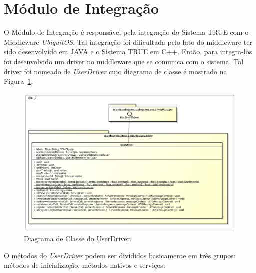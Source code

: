\section{Módulo de Integração}

O Módulo de Integração é responsável pela integração do Sistema TRUE  com o Middleware \textit{UbiquitOS}. Tal integração foi dificultada pelo fato do middleware ter sido desenvolvido em JAVA e o Sistema TRUE em C++. Então, para integra-los foi desenvolvido um driver no middleware que se comunica com o sistema. Tal driver foi nomeado de \textit{UserDriver} cujo diagrama de classe é mostrado na Figura~\ref{fig:userdriver}.

	\begin{figure}[hbt]
		\begin{center}
			\includegraphics[scale=0.45]{figuras/4.ProblemaEProposta/diagrama-classe-userdriver.png}
		\end{center}
		\caption{Diagrama de Classe do UserDriver.}
		\label{fig:userdriver}
	\end{figure}

O métodos do \textit{UserDriver} podem ser divididos basicamente em três grupos: métodos de inicialização, métodos nativos e serviços:

